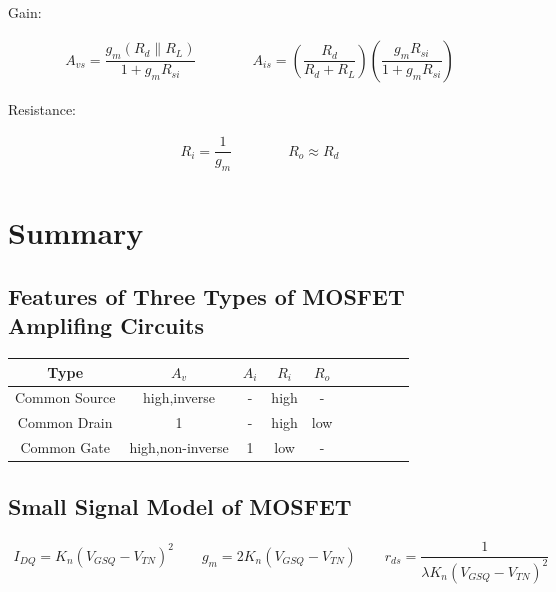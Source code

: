 Gain:

\begin{equation*}
  \begin{aligned}
    A_{vs} = \dfrac{g_m \left( R_d \parallel R_L \right)}{1 + g_m R_{si}}  \quad\quad \quad\quad 
    A_{is} = \left( \dfrac{R_d}{R_d + R_L}  \right) \left( \dfrac{g_m R_{si}}{1 + g_m R_{si}}  \right)
  \end{aligned}
\end{equation*}

Resistance:

\begin{equation*}
  \begin{aligned}
    R_i = \dfrac{1}{g_m} \quad\quad \quad\quad 
    R_o \approx R_d
  \end{aligned}
\end{equation*}

\section{Summary}

\subsection{Features of Three Types of MOSFET Amplifing Circuits}

\begin{table}[htbp]
  \centering
  \begin{tabular}{|Sc|Sc|Sc|Sc|Sc|}
    \hline
    Type & $A_v$ & $A_i$ & $R_i$ & $R_o$ \\
    \hline
    Common Source & high,inverse & - & high & - \\
    \hline
    Common Drain & 1 & - & high & low \\
    \hline
    Common Gate & high,non-inverse & 1 & low & - \\
    \hline
  \end{tabular}
\end{table}

\subsection{Small Signal Model of MOSFET}

\begin{equation*}
  \begin{aligned}
    I_{DQ} = K_n \left( V_{GSQ} - V_{TN} \right)^2 \quad\quad
    g_m = 2 K_n \left( V_{GSQ} - V_{TN} \right) \quad\quad
    r_{ds} = \dfrac{1}{\lambda K_n \left( V_{GSQ} - V_{TN} \right)^2} 
  \end{aligned}
\end{equation*}

